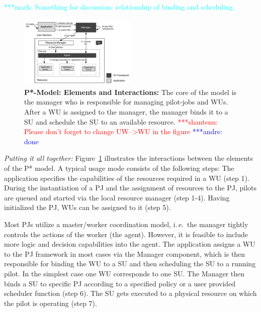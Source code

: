 \documentclass[conference,final]{IEEEtran}
\newcommand{\jhanote}[1]{ {\textcolor{red} { ***shantenu: #1 }}}
\newcommand{\alnote}[1]{ {\textcolor{blue} { ***andre: #1 }}}
\newcommand{\msnote}[1]{ {\textcolor{cyan} { ***mark: #1 }}}
\newcommand{\alnote}[1]{}
\newcommand{\jhanote}[1]{}
\newcommand{\msnote}[1]{}
\newcommand{\upp}{\vspace*{-0.5em}}
\begin{document}




\msnote{Something for discussion: relationship of binding and scheduling.}

\begin{figure}[htbp]
    \centering    
    \includegraphics[width=0.5\textwidth]{figures/pstar_model.pdf}
    \caption{\textbf{P*-Model: Elements and Interactions:} The core of
      the model is the manager who is responsible for managing
      pilot-jobs and WUs. After a WU is assigned to the manager, the manager
      binds it to a SU and schedule the SU to an available
      resource. \jhanote{Please don't forget to change UW-->WU in the
        figure}\alnote{done}\upp\upp}
    \label{fig:figures_pstar}
\end{figure}

{\it Putting it all together:} Figure~\ref{fig:figures_pstar}
illustrates the interactions between the elements of the P* model. A
typical usage mode consists of the following steps: The application
specifies the capabilities of the resources required in a WU
(step 1). During the instantiation of a PJ and the assignment of
resources to the PJ, pilots are queued and started via the local
resource manager (step 1-4). Having initialized the PJ, WUs can be
assigned to it (step 5).


Most PJs utilize a master/worker coordination model, i.\,e.\ the
manager tightly controls the actions of the worker (the
agent). However, it is feasible to include more logic and decision
capabilities into the agent. The application assigns a WU
to the PJ framework in most cases via the Manager component, which is
then responsible for binding the WU to a SU and then scheduling the SU 
to a running pilot.  In
the simplest case one WU corresponds to one SU. The Manager then binds
a SU to specific PJ according to a specified policy or a user provided
scheduler function (step 6). The SU gets executed to a physical
resource on which the pilot is operating (step 7).
\end{document}
